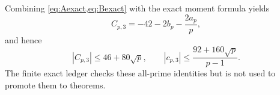 Combining \cref{eq:Aexact,eq:Bexact} with the exact moment formula yields
\[
 C_{p,3}=-42-2b_p-\frac{2a_p}{p},
\]
and hence
\[
 |C_{p,3}|\le46+80\sqrt p,
 \qquad
 |c_{p,3}|\le\frac{92+160\sqrt p}{p-1}.
\]
The finite exact ledger checks these all-prime identities but is not used
to promote them to theorems.
